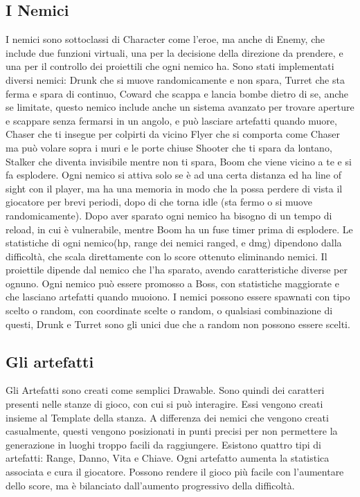 \documentclass[12pt]{article}
\begin{document}
\subsection{I Nemici}
I nemici sono sottoclassi di Character come l'eroe, ma anche di Enemy, che include due funzioni virtuali, una per la 
decisione della direzione da prendere, e una per il controllo dei proiettili che ogni nemico ha.
Sono stati implementati diversi nemici: \hfill\break
Drunk che si muove randomicamente e non spara,\hfill\break
Turret che sta ferma e spara di continuo, \hfill\break
Coward che scappa e lancia bombe dietro di se, anche se limitate, questo nemico include anche un sistema avanzato per 
trovare aperture e scappare senza fermarsi in un angolo, e può lasciare artefatti quando muore,\hfill\break
Chaser che ti insegue per colpirti da vicino  \hfill\break
Flyer che si comporta come Chaser ma può volare sopra i muri e le porte chiuse  \hfill\break
Shooter che ti spara da lontano,  \hfill\break
Stalker che diventa invisibile mentre non ti spara,  \hfill\break
Boom che viene vicino a te e si fa esplodere.  \hfill\break
\newline
Ogni nemico si attiva solo se è ad una certa distanza ed ha line of sight con il player, ma ha una memoria in modo che la possa perdere di vista il giocatore per brevi periodi, dopo di che torna idle (sta fermo o si muove randomicamente).
Dopo aver sparato ogni nemico ha bisogno di un tempo di reload, in cui è vulnerabile, mentre Boom ha un fuse timer prima di esplodere. \hfill\break
Le statistiche di ogni nemico(hp, range dei nemici ranged, e dmg) dipendono dalla difficoltà, che scala direttamente
 con lo score ottenuto eliminando nemici.
Il proiettile dipende dal nemico che l'ha sparato, avendo caratteristiche diverse per ognuno. \hfill\break
Ogni nemico può essere promosso a Boss, con statistiche maggiorate e che lasciano artefatti quando muoiono.\hfill\break
I nemici possono essere spawnati con tipo scelto o random, con coordinate scelte o random, o qualsiasi combinazione
 di questi, Drunk e Turret sono gli unici due che a random non possono essere scelti.



\subsection{Gli artefatti}
Gli Artefatti sono creati come semplici Drawable. Sono quindi dei caratteri presenti nelle stanze di gioco, con cui si può interagire. Essi vengono creati insieme al Template della stanza. A differenza dei nemici che vengono creati
 casualmente, questi vengono posizionati in punti precisi per non permettere la generazione in luoghi troppo facili da raggiungere. \hfill\break
Esistono quattro tipi di artefatti: Range, Danno, Vita e Chiave.
Ogni artefatto aumenta la statistica associata e cura il giocatore.
Possono rendere il gioco più facile con l'aumentare dello score, ma è bilanciato dall'aumento progressivo della difficoltà.
\end{document}
